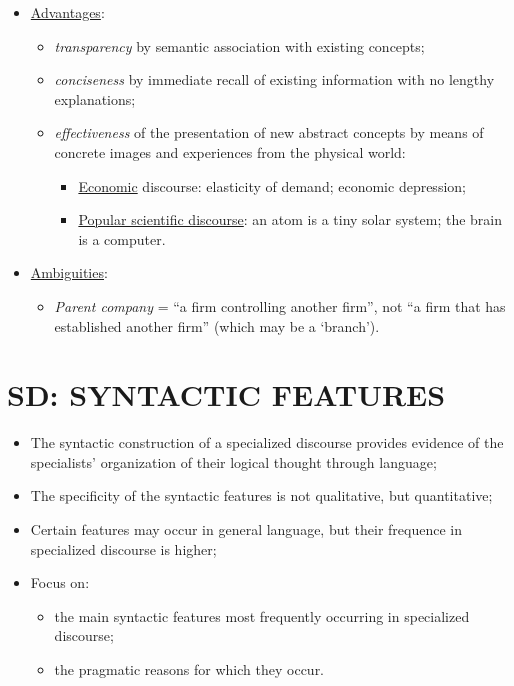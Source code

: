 \begin{itemize}

\item\underline{Advantages}:

\begin{itemize}
\item\textit{transparency} by semantic association with existing concepts;
\item\textit{conciseness} by immediate recall of existing information with no lengthy explanations;
\item\textit{effectiveness} of the presentation of new abstract concepts by means of concrete images and experiences from the physical world:

\begin{itemize}
\item\underline{Economic} discourse: elasticity of demand; economic depression;
\item\underline{Popular scientific discourse}: an atom is a tiny solar system; the brain is a computer.
\end{itemize}

\end{itemize}

\item\underline{Ambiguities}: 
\begin{itemize}
\item\textit{Parent company} = “a firm controlling another firm”, not “a firm that has established another firm” (which may be a ‘branch’).
\end{itemize}

\end{itemize}


\section{SD: SYNTACTIC FEATURES}

\begin{itemize}

\item The syntactic construction of a specialized discourse provides evidence of the specialists’ organization of their logical thought through language;
\item The specificity of the syntactic features is not qualitative, but quantitative;
\item Certain features may occur in general language, but their frequence in specialized discourse is higher;
\item Focus on:

\begin{itemize}
\item the main syntactic features most frequently occurring in specialized discourse;
\item the pragmatic reasons for which they occur.  
\end{itemize}

\end{itemize}

